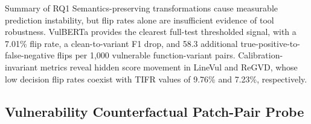 \documentclass[a4paper,fleqn]{cas-dc}
\begin{document}
\begin{table}[t]
  \centering
  \caption{Calibration-invariant score robustness.}
  \label{tab:calibration-invariant}
\end{table}

\begin{rqsummarybox}{Summary of RQ1}
Semantics-preserving transformations cause measurable prediction instability,
but flip rates alone are insufficient evidence of tool robustness. VulBERTa
provides the clearest full-test thresholded signal, with a 7.01\% flip rate, a
clean-to-variant F1 drop, and 58.3 additional true-positive-to-false-negative
flips per 1,000 vulnerable function-variant pairs. Calibration-invariant
metrics reveal hidden score movement in LineVul and ReGVD, whose low decision
flip rates coexist with TIFR values of 9.76\% and 7.23\%, respectively.
\end{rqsummarybox}

\subsection{Vulnerability Counterfactual Patch-Pair Probe}
\label{sec:counterfactual-patch-probe}
\end{document}
